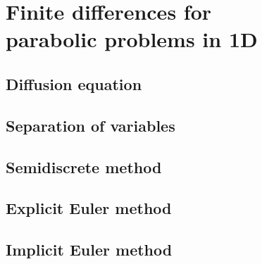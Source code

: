 \chapter[Finite differences for parabolic problems]{Finite differences for \\
parabolic problems in 1D}

\section{Diffusion equation}

\section{Separation of variables}

\section{Semidiscrete method}

\section{Explicit Euler method}

\section{Implicit Euler method}

